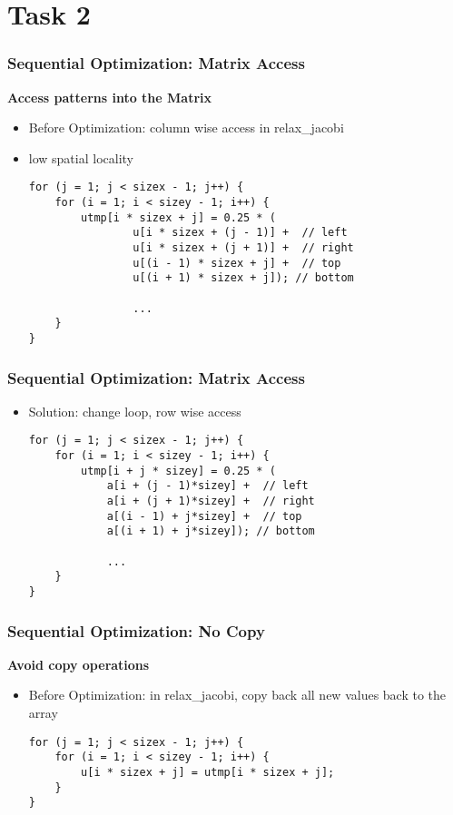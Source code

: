 \section{Task 2}
\begin{frame}[fragile]
\frametitle{Sequential Optimization: Matrix Access}
\textbf{Access patterns into the Matrix}
\begin {itemize}
\item Before Optimization: column wise access in relax\_jacobi
\item low spatial locality

\begin{lstlisting}
for (j = 1; j < sizex - 1; j++) {
	for (i = 1; i < sizey - 1; i++) {
		utmp[i * sizex + j] = 0.25 * (
				u[i * sizex + (j - 1)] +  // left
				u[i * sizex + (j + 1)] +  // right
				u[(i - 1) * sizex + j] +  // top
				u[(i + 1) * sizex + j]); // bottom
				
				...
	}
}
\end{lstlisting}

\end {itemize}
\end{frame}

\begin{frame}[fragile]
\frametitle{Sequential Optimization: Matrix Access}
\begin {itemize}
\item{Solution: change loop, row wise access }
\begin{lstlisting}
for (j = 1; j < sizex - 1; j++) {
	for (i = 1; i < sizey - 1; i++) {
		utmp[i + j * sizey] = 0.25 * (
			a[i + (j - 1)*sizey] +  // left
			a[i + (j + 1)*sizey] +  // right
			a[(i - 1) + j*sizey] +  // top
			a[(i + 1) + j*sizey]); // bottom
						
			...
	}
}
\end{lstlisting}

\end {itemize}
\end{frame}

\begin{frame}[fragile]
\frametitle{Sequential Optimization: No Copy}

\textbf{Avoid copy operations}
\begin {itemize}
\item Before Optimization: in relax\_jacobi, copy back all new values back to the array
\begin{lstlisting}
for (j = 1; j < sizex - 1; j++) {
	for (i = 1; i < sizey - 1; i++) {
		u[i * sizex + j] = utmp[i * sizex + j];
	}
}
\end{lstlisting}

\end {itemize}
\end{frame}


